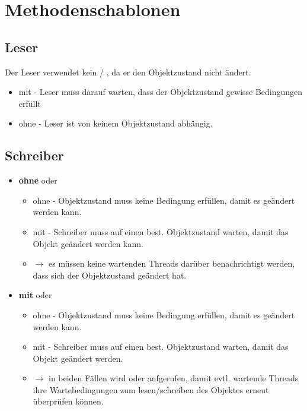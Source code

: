 \section{Methodenschablonen}

\subsection{Leser}

Der Leser verwendet kein  / , da er den Objektzustand nicht ändert.

\begin{itemize}
    \item mit  - Leser muss darauf warten, dass der Objektzustand gewisse Bedingungen erfüllt
    \item ohne  - Leser ist von keinem Objektzustand abhängig.
\end{itemize}


\subsection{Schreiber}

\begin{itemize}
    \item \textbf{ohne}  oder 
    \begin{itemize}
        \item ohne  - Objektzustand muss keine Bedingung erfüllen, damit es geändert werden kann.
        \item mit  - Schreiber muss auf einen best. Objektzustand warten, damit das Objekt geändert werden kann.
        \item[] $\rightarrow$ es müssen keine wartenden Threads darüber benachrichtigt werden, dass sich der Objektzustand geändert hat.
    \end{itemize}
    \item \textbf{mit}  oder 
    \begin{itemize}
        \item ohne  - Objektzustand muss keine Bedingung erfüllen, damit es geändert werden kann.
        \item mit  - Schreiber muss auf einen best. Objektzustand warten, damit das Objekt geändert werden.
        \item[] $\rightarrow$ in beiden Fällen wird  oder  aufgerufen, damit evtl. wartende Threads ihre Wartebedingungen zum lesen/schreiben des Objektes erneut überprüfen können.
    \end{itemize}

\end{itemize}



